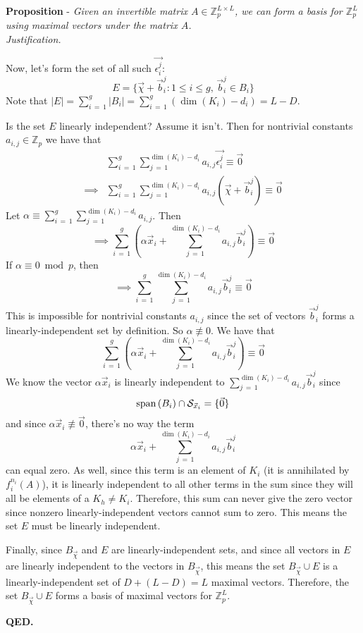 \documentclass[a4paper, 12pt, reqno]{amsart}
\newcommand\vecspan[1]{\textup{span}\left( #1 \right)}
\newcounter{propcounter}
\newenvironment{proposition}[1]
{
	\refstepcounter{propcounter}
	\textbf{Proposition \thepropcounter} - \emph{#1} \\
	\emph{Justification.}
}
{
	\textbf{QED.} \\
}
\begin{document}
\begin{proposition}{Given an invertible matrix $A \in \mathds{Z}_p^{L \times L}$, we can form a basis for $\mathds{Z}_p^L$ using maximal vectors under the matrix 
		$A$.}
			Now, let's form the set of all such $\vec{\epsilon_i^j}$:
			\[
				E = \{\vec{\chi} + \vec{b}_i^j : 1 \leq i \leq g,\, \vec{b}_i^j \in B_i\}
			\]
			Note that $|E| = \sum_{i\,=\,1}^g |B_i| = \sum_{i\,=\,1}^g (\dim{(K_i)}-d_i) = L-D$.
			
			Is the set $E$ linearly independent? Assume it isn't. Then for nontrivial constants $a_{i,j} \in \mathds{Z}_p$ we have that
			\begin{align*}
				        & \sum_{i\,=\,1}^g \sum_{j\,=\,1}^{\dim{(K_i)}-d_i} a_{i,j}\vec{\epsilon_i^j} \equiv \vec{0} \\
				\implies& \sum_{i\,=\,1}^g \sum_{j\,=\,1}^{\dim{(K_i)}-d_i} a_{i, j}(\vec{\chi} + \vec{b}_i^j) \equiv \vec{0}
			\end{align*}
			Let $\alpha \equiv \sum_{i\,=\,1}^g \sum_{j\,=\,1}^{\dim{(K_i)}-d_i} a_{i,j}$. Then
			\[
				\implies \sum_{i\,=\,1}^g \left( \alpha\vec{x}_i + \sum_{j\,=\,1}^{\dim{(K_i)}-d_i} a_{i,j}\vec{b}_i^j \right) \equiv \vec{0}
			\]
			If $\alpha \equiv 0 \bmod{p}$, then
			\[
				\implies \sum_{i\,=\,1}^g \sum_{j\,=\,1}^{\dim{(K_i)}-d_i} a_{i,j}\vec{b}_i^j \equiv \vec{0}
			\]
			This is impossible for nontrivial constants $a_{i,j}$ since the set of vectors $\vec{b}_i^j$ forms a linearly-independent set by definition. So 
			$\alpha \not\equiv 0$. We have that
			\[
				\sum_{i\,=\,1}^g \left( \alpha\vec{x}_i + \sum_{j\,=\,1}^{\dim{(K_i)}-d_i} a_{i,j}\vec{b}_i^j \right) \equiv \vec{0}
			\]
			We know the vector $\alpha\vec{x}_i$ is linearly independent to $\sum_{j\,=\,1}^{\dim{(K_i)}-d_i} a_{i,j}\vec{b}_i^j$ since 
			\[
				\vecspan{B_i} \cap \mathcal{S}_{\vec{x}_i} = \{\vec{0}\}
			\]
			and since $\alpha\vec{x}_i \not\equiv \vec{0}$, there's no way the term
			\[
				\alpha\vec{x}_i + \sum_{j\,=\,1}^{\dim{(K_i)}-d_i} a_{i,j}\vec{b}_i^j
			\]
			can equal zero. As well, since this term is an element of $K_i$ (it is annihilated by $f_i^{n_i}(A)$), it is linearly independent to all other terms in the
			sum since they will all be elements of a $K_h \neq K_i$. Therefore, this sum can never give the zero vector since nonzero linearly-independent vectors cannot sum
			to zero. This means the set $E$ must be linearly independent.
			
			Finally, since $B_{\vec{\chi}}$ and $E$ are linearly-independent sets, and since all vectors in $E$ are linearly independent to the vectors in $B_{\vec{\chi}}$,
			this means the set $B_{\vec{\chi}} \cup E$ is a linearly-independent set of $D + (L - D) = L$ maximal vectors. Therefore, the set $B_{\vec{\chi}} \cup E$ forms
			a basis of maximal vectors for $\mathds{Z}_p^L$.
		\end{proposition}
		
\end{document}
